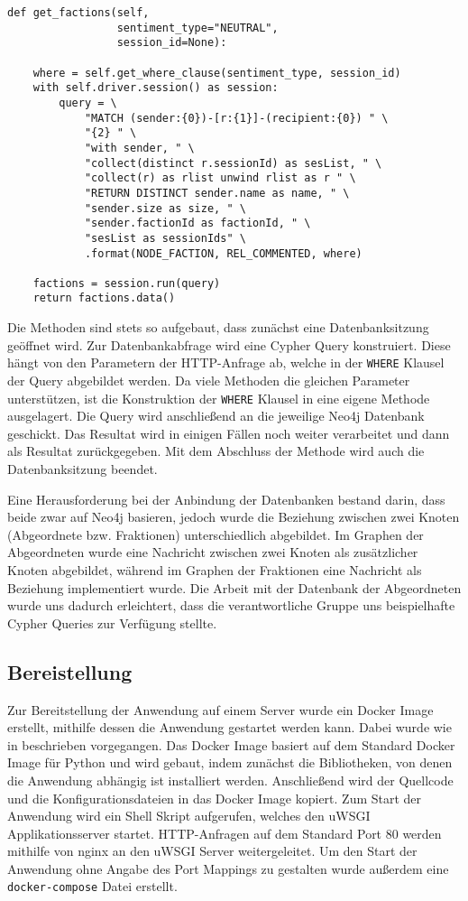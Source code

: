\begin{lstlisting}[caption={Zugriff auf Neo4j DB: get\_factions}, captionpos=b]
def get_factions(self,
                 sentiment_type="NEUTRAL",
                 session_id=None):

    where = self.get_where_clause(sentiment_type, session_id)
    with self.driver.session() as session:
        query = \
            "MATCH (sender:{0})-[r:{1}]-(recipient:{0}) " \
            "{2} " \
            "with sender, " \
            "collect(distinct r.sessionId) as sesList, " \
            "collect(r) as rlist unwind rlist as r " \
            "RETURN DISTINCT sender.name as name, " \
            "sender.size as size, " \
            "sender.factionId as factionId, " \
            "sesList as sessionIds" \
            .format(NODE_FACTION, REL_COMMENTED, where)

    factions = session.run(query)
    return factions.data()
\end{lstlisting}

Die Methoden sind stets so aufgebaut, dass zunächst eine Datenbanksitzung geöffnet wird.
Zur Datenbankabfrage wird eine Cypher Query konstruiert. Diese hängt von den Parametern der HTTP-Anfrage ab, welche in der \lstinline{WHERE} Klausel der Query abgebildet werden.
Da viele Methoden die gleichen Parameter unterstützen, ist die Konstruktion der \lstinline{WHERE} Klausel in eine eigene Methode ausgelagert.
Die Query wird anschließend an die jeweilige Neo4j Datenbank geschickt. Das Resultat wird in einigen Fällen noch weiter verarbeitet und dann als Resultat zurückgegeben.
Mit dem Abschluss der Methode wird auch die Datenbanksitzung beendet.

Eine Herausforderung bei der Anbindung der Datenbanken bestand darin, dass beide zwar auf Neo4j basieren, jedoch wurde die Beziehung zwischen zwei Knoten (Abgeordnete bzw. Fraktionen) unterschiedlich abgebildet.
Im Graphen der Abgeordneten wurde eine Nachricht zwischen zwei Knoten als zusätzlicher Knoten abgebildet, während im Graphen der Fraktionen eine Nachricht als Beziehung implementiert wurde.
Die Arbeit mit der Datenbank der Abgeordneten wurde uns dadurch erleichtert, dass die verantwortliche Gruppe uns beispielhafte Cypher Queries zur Verfügung stellte.

\subsection{Bereistellung}
Zur Bereitstellung der Anwendung auf einem Server wurde ein Docker Image erstellt, mithilfe dessen die Anwendung gestartet werden kann.
Dabei wurde wie in \cite{flask_docker} beschrieben vorgegangen.
Das Docker Image basiert auf dem Standard Docker Image für Python und wird gebaut, indem zunächst die Bibliotheken, von denen die Anwendung abhängig ist installiert werden.
Anschließend wird der Quellcode und die Konfigurationsdateien in das Docker Image kopiert.
Zum Start der Anwendung wird ein Shell Skript aufgerufen, welches den uWSGI Applikationsserver startet.
HTTP-Anfragen auf dem Standard Port 80 werden mithilfe von nginx an den uWSGI Server weitergeleitet.
Um den Start der Anwendung ohne Angabe des Port Mappings zu gestalten wurde außerdem eine \lstinline{docker-compose} Datei erstellt.


